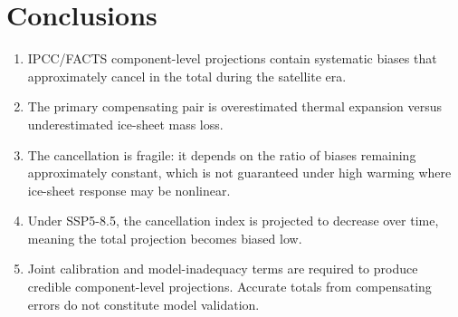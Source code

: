 \documentclass[11pt]{article}
\begin{document}
\section{Conclusions}
\label{sec:conclusions}

\begin{enumerate}
  \item IPCC/FACTS component-level projections contain systematic biases that approximately cancel in the total during the satellite era.
  \item The primary compensating pair is overestimated thermal expansion versus underestimated ice-sheet mass loss.
  \item The cancellation is fragile: it depends on the ratio of biases remaining approximately constant, which is not guaranteed under high warming where ice-sheet response may be nonlinear.
  \item Under SSP5-8.5, the cancellation index is projected to decrease over time, meaning the total projection becomes biased low.
  \item Joint calibration and model-inadequacy terms are required to produce credible component-level projections.  Accurate totals from compensating errors do not constitute model validation.
\end{enumerate}




\end{document}
